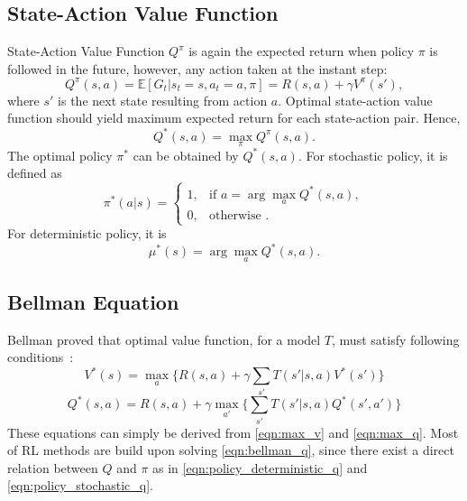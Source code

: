 \subsection{State-Action Value Function}

State-Action Value Function $Q^{\pi}$ is again the expected return when policy $\pi$ is followed in the future, 
however, any action taken at the instant step:
\begin{equation}
\label{eqn:q_def}
Q^{\pi}(s,a) = \mathbb{E}[G_t|s_t=s, a_t=a, \pi] = R(s,a) + \gamma V^{\pi}(s'), %
\end{equation}
where $s'$ is the next state resulting from action $a$.
Optimal state-action value function should yield maximum expected return for each state-action pair. Hence,
\begin{equation}
\label{eqn:max_q}
Q^{*}(s,a) = \max_{\pi} Q^{\pi}(s,a).
\end{equation}
The optimal policy $\pi^*$ can be obtained by $Q^{*}(s,a)$. For stochastic policy, it is defined as  
\begin{equation}
\label{eqn:policy_stochastic_q}
\pi^{*}(a|s) = 
\begin{cases}
1,   & \text{if  } a = \arg\max_{a} Q^{*}(s,a), \\
0,   & \text{otherwise  }.
\end{cases} 
\end{equation}
For deterministic policy, it is
\begin{equation}
\label{eqn:policy_deterministic_q}
\mu^{*}(s) = \arg\max_{a} Q^{*}(s,a).
\end{equation}

\subsection{Bellman Equation}

Bellman proved that optimal value function, for a model $T$, must satisfy following conditions~\cite{bellman_dynamic_2003}: 
\begin{equation}
\label{eqn:bellman_v}
V^{*}(s) = \max_{a} \Big\{ R(s,a) + \gamma \sum_{s'} T(s'|s,a) V^{*}(s') \Big\}
\end{equation}
\begin{equation}
\label{eqn:bellman_q}
Q^{*}(s,a) = R(s,a) + \gamma \max_{a'} \Big\{ \sum_{s'} T(s'|s,a) Q^{*}(s',a') \Big\}
\end{equation}
These equations can simply be derived from \eqref{eqn:max_v} and \eqref{eqn:max_q}. 
Most of RL methods are build upon solving \eqref{eqn:bellman_q}, since there exist a direct relation between $Q$ and $\pi$ as in \eqref{eqn:policy_deterministic_q} and \eqref{eqn:policy_stochastic_q}.
